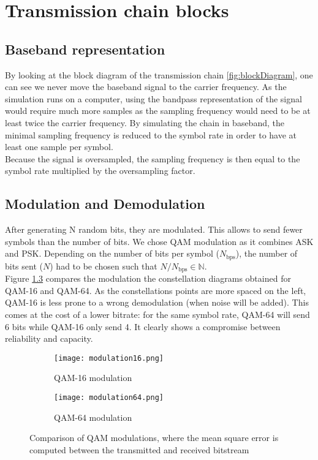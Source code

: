 \setcounter{secnumdepth}{-1}

\chapter{Transmission chain blocks}

\section{Baseband representation}

By looking at the block diagram of the transmission chain \ref{fig:blockDiagram}, one can see we never move the baseband signal to the carrier frequency. As the simulation runs on a computer, using the bandpass representation of the signal would require much more samples as the sampling frequency would need to be at least twice the carrier frequency. By simulating the chain in baseband, the minimal sampling frequency is reduced to the symbol rate in order to have at least one sample per symbol. \\
Because the signal is oversampled, the sampling frequency is then equal to the symbol rate multiplied by the oversampling factor. \\

\section{Modulation and Demodulation}

After generating N random bits, they are modulated. This allows to send fewer symbols than the number of bits. We chose QAM modulation as it combines ASK and PSK. Depending on the number of bits per symbol ($N_{\text{bps}}$), the number of bits sent ($N$) had to be chosen such that  $N / N_{\text{bps}} \in \mathbb{N}$. \\
Figure \ref{fig:QAMComparison} compares the modulation the constellation diagrams obtained for QAM-16 and QAM-64. As the constellations points are more spaced on the left, QAM-16 is less prone to a wrong demodulation (when noise will be added). This comes at the cost of a lower bitrate: for the same symbol rate, QAM-64 will send 6 bits while QAM-16 only send 4. It clearly shows a compromise between reliability and capacity. \\

\begin{figure}[H]
    \centering
    \begin{subfigure}[b]{0.45\linewidth}
        \centering
        \texttt{[image: modulation16.png]}
        \caption{QAM-16 modulation}
        \label{fig:QAM16}
    \end{subfigure}
    \hfill
    \begin{subfigure}[b]{0.45\linewidth}
        \centering
        \texttt{[image: modulation64.png]}
        \caption{QAM-64 modulation}
        \label{fig:QAM64}
    \end{subfigure}
    \caption{Comparison of QAM modulations, where the mean square error is computed between the transmitted and received bitstream}
    \label{fig:QAMComparison}
\end{figure}

